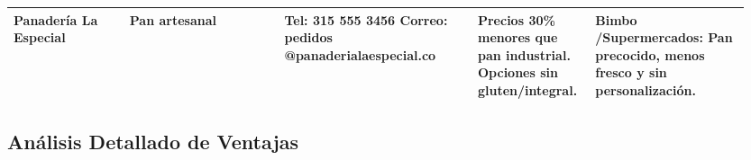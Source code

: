 \documentclass[letterpaper, 11pt]{report}
\begin{document}
\begin{longtable}{|p{0.15\linewidth}|p{0.20\linewidth}|p{0.25\linewidth}|p{0.15\linewidth}|p{0.20\linewidth}|}
      \hline
      Panadería La Especial                                                                                                   & Pan artesanal                & Tel: 315 555 3456 \hfil \break Correo: \hfil{} \break{} pedidos\hfil{} \break{}@panaderialaespecial.co &
      Precios 30\% menores que pan industrial. \hfil \break Opciones sin gluten/integral.                                     &
      Bimbo\hfil{} \break{} /Supermercados: Pan precocido, menos fresco y sin personalización.                                                                                                                                                                                                                                               \\
      \hline
\end{longtable}

\subsection{Análisis Detallado de Ventajas}
\end{document}

